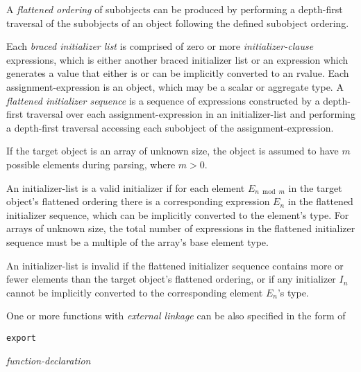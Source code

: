 \p A \textit{flattened ordering} of subobjects can be produced by performing a
depth-first traversal of the subobjects of an object following the defined
subobject ordering.

\p Each \textit{braced initializer list} is comprised of zero or more
\textit{initializer-clause} expressions, which is either another braced
initializer list or an expression which generates a value that either is or can
be implicitly converted to an rvalue. Each assignment-expression is an object,
which may be a scalar or aggregate type. A \textit{flattened initializer
sequence} is a sequence of expressions constructed by a depth-first traversal
over each assignment-expression in an initializer-list and performing a
depth-first traversal accessing each subobject of the assignment-expression.

\p If the target object is an array of unknown size, the object is assumed to
have \(m\) possible elements during parsing, where \(m>0\).

\p An initializer-list is a valid initializer if for each element
\(E_{n \bmod m}\) in the target object's flattened ordering there is a
corresponding expression \(E_n\) in the flattened initializer sequence, which
can be implicitly converted to the element's type. For arrays of unknown size,
the total number of expressions in the flattened initializer sequence must be a
multiple of the array's base element type.

\p An initializer-list is invalid if the flattened initializer sequence contains
more or fewer elements than the target object's flattened ordering, or if any
initializer \(I_n\) cannot be implicitly converted to the corresponding element
\(E_n\)'s type.



\p One or more functions with \textit{external linkage} can be also specified in the form of

\begin{grammar}
  \br
  \texttt{export} \terminal{\{}  \terminal{\}}\br

  \br
  \textit{function-declaration} 
\end{grammar}

